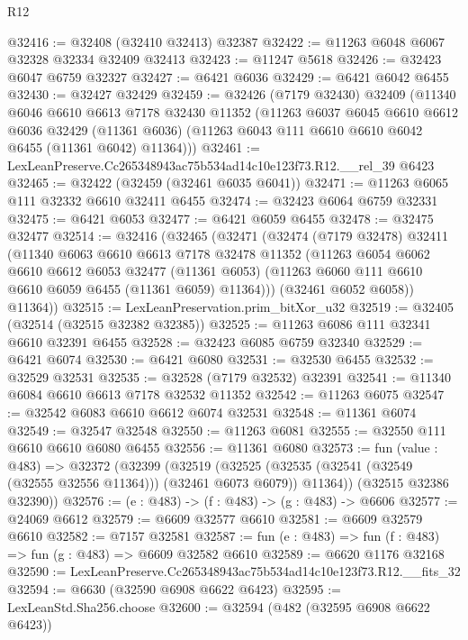 \begin{lexlean}{R12}
\begin{coremodule}
@32416 := @32408 (@32410 @32413) @32387
@32422 := @11263 @6048 @6067 @32328 @32334 @32409 @32413
@32423 := @11247 @5618
@32426 := @32423 @6047 @6759 @32327
@32427 := @6421 @6036
@32429 := @6421 @6042 @6455
@32430 := @32427 @32429
@32459 := @32426
    (@7179 @32430)
    @32409
    (@11340
      @6046
      @6610
      @6613
      @7178
      @32430
      @11352
      (@11263
        @6037
        @6045
        @6610
        @6612
        @6036
        @32429
        (@11361 @6036)
        (@11263 @6043 @111 @6610 @6610 @6042 @6455 (@11361 @6042) @11364)))
@32461 := LexLeanPreserve.Cc265348943ac75b534ad14c10e123f73.R12.__rel_39 @6423
@32465 := @32422 (@32459 (@32461 @6035 @6041))
@32471 := @11263 @6065 @111 @32332 @6610 @32411 @6455
@32474 := @32423 @6064 @6759 @32331
@32475 := @6421 @6053
@32477 := @6421 @6059 @6455
@32478 := @32475 @32477
@32514 := @32416
    (@32465
      (@32471
        (@32474
          (@7179 @32478)
          @32411
          (@11340
            @6063
            @6610
            @6613
            @7178
            @32478
            @11352
            (@11263
              @6054
              @6062
              @6610
              @6612
              @6053
              @32477
              (@11361 @6053)
              (@11263 @6060 @111 @6610 @6610 @6059 @6455 (@11361 @6059) @11364)))
          (@32461 @6052 @6058))
        @11364))
@32515 := LexLeanPreservation.prim_bitXor_u32
@32519 := @32405 (@32514 (@32515 @32382 @32385))
@32525 := @11263 @6086 @111 @32341 @6610 @32391 @6455
@32528 := @32423 @6085 @6759 @32340
@32529 := @6421 @6074
@32530 := @6421 @6080
@32531 := @32530 @6455
@32532 := @32529 @32531
@32535 := @32528 (@7179 @32532) @32391
@32541 := @11340 @6084 @6610 @6613 @7178 @32532 @11352
@32542 := @11263 @6075
@32547 := @32542 @6083 @6610 @6612 @6074 @32531
@32548 := @11361 @6074
@32549 := @32547 @32548
@32550 := @11263 @6081
@32555 := @32550 @111 @6610 @6610 @6080 @6455
@32556 := @11361 @6080
@32573 := fun (value : @483) =>
  @32372
    (@32399
      (@32519
        (@32525 (@32535 (@32541 (@32549 (@32555 @32556 @11364))) (@32461 @6073 @6079)) @11364))
      (@32515 @32386 @32390))
@32576 := (e : @483) -> (f : @483) -> (g : @483) -> @6606
@32577 := @24069 @6612
@32579 := @6609 @32577 @6610
@32581 := @6609 @32579 @6610
@32582 := @7157 @32581
@32587 := fun (e : @483) => fun (f : @483) => fun (g : @483) => @6609 @32582 @6610
@32589 := @6620 @1176 @32168
@32590 := LexLeanPreserve.Cc265348943ac75b534ad14c10e123f73.R12.__fits_32
@32594 := @6630 (@32590 @6908 @6622 @6423)
@32595 := LexLeanStd.Sha256.choose
@32600 := @32594 (@482 (@32595 @6908 @6622 @6423))

\end{coremodule}
\end{lexlean}
